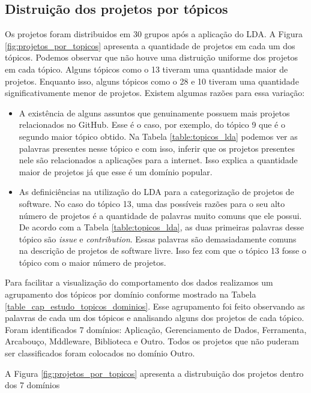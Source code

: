 \subsection{Distruição dos projetos por tópicos}


Os projetos foram distribuidos em 30 grupos após a aplicação do LDA. A Figura \ref{fig:projetos_por_topicos} apresenta a quantidade de projetos em cada um dos tópicos. Podemos observar que não houve uma distruição uniforme dos projetos em cada tópico. Alguns tópicos como o 13 tiveram uma quantidade maior de projetos. Enquanto isso, alguns tópicos como o 28 e 10 tiveram uma quantidade significativamente menor de projetos. Existem algumas razões para essa variação:

\begin{itemize}
\item A existência de alguns assuntos que genuinamente possuem mais projetos relacionados no GitHub. Esse é o caso, por exemplo, do tópico 9 que é o segundo maior tópico obtido. Na Tabela \ref{table:topicos_lda} podemos ver as palavras presentes nesse tópico e com isso, inferir que os projetos presentes nele são relacionados a aplicações para a internet. Isso explica a quantidade maior de projetos já que esse é um domínio popular. 
\item As definiciências na utilização do LDA para a categorização de projetos de software. No caso do tópico 13, uma das possíveis razões para o seu alto número de projetos é a quantidade de palavras muito comuns que ele possui. De acordo com a Tabela \ref{table:topicos_lda}, as duas primeiras palavras desse tópico são \textit{issue} e \textit{contribution}. Essas palavras são demasiadamente comuns na descrição de projetos de software livre. Isso fez com que o tópico 13 fosse o tópico com o maior número de projetos.
\end{itemize} 


Para facilitar a visualização do comportamento dos dados  realizamos um agrupamento dos tópicos por domínio conforme mostrado na Tabela \ref{table_cap_estudo_topicos_dominios}. Esse agrupamento foi feito observando as palavras de cada um dos tópicos e analisando alguns dos projetos de cada tópico. Foram identificados 7 domínios: Aplicação, Gerenciamento de Dados, Ferramenta, Arcabouço, Mddleware, Biblioteca e Outro. Todos os projetos que não puderam ser classificados foram colocados no domínio Outro.

A Figura \ref{fig:projetos_por_topicos} apresenta a distrubuição dos projetos dentro dos 7 domínios 




